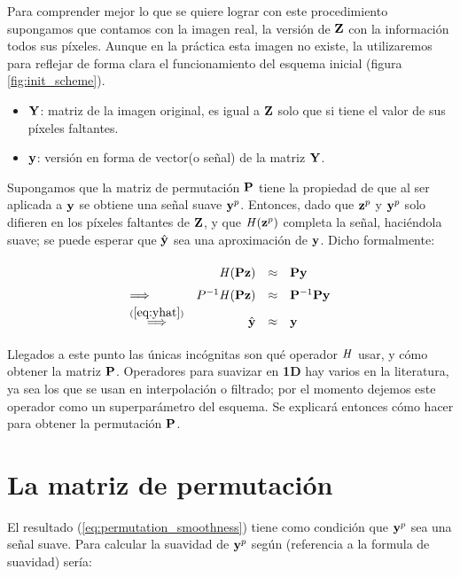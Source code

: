 Para comprender mejor lo que se quiere lograr con este procedimiento supongamos que contamos con la imagen real, la versi\'on de $\Z$ con la informaci\'on todos sus p\'ixeles. Aunque en la pr\'actica esta imagen no existe, la utilizaremos para reflejar de forma clara el funcionamiento del esquema inicial (figura \ref{fig:init_scheme}).

\begin{itemize}
	\item $\Y$: matriz de la imagen original, es igual a $\Z$ solo que si tiene el valor de sus p\'ixeles faltantes. 
	\item $\y$: versión en forma de vector(o señal) de la matriz $\Y$.
\end{itemize}

Supongamos que la matriz de permutaci\'on $\P$ tiene la propiedad de que al ser aplicada a $\y$ se obtiene una señal suave $\y^p$. Entonces, dado que $\z^p$ y $\y^p$ solo difieren en los p\'ixeles faltantes de $\Z$, y que $\H(\z^p)$ completa la señal, haciéndola suave; se puede esperar que $\yhat$ sea una aproximaci\'on de $\y$. Dicho formalmente:

\begin{equation}
	\def\arraystretch{1.5}
	\begin{array}{lrcl}
		                                           &     \H (\P\z ) &\approx& \P\y        \\ 
		\Longrightarrow                            & P^{-1}\H(\P\z) &\approx& \P^{-1}\P\y \\
		\overset{(\ref{eq:yhat})}{\Longrightarrow} &          \yhat &\approx& \y          \\
	\end{array}
	\label{eq:permutation_smoothness}
\end{equation}

Llegados a este punto las únicas incógnitas son qu\'e operador $\H$ usar, y c\'omo obtener la matriz $\P$. Operadores para suavizar en \textbf{1D} hay varios en la literatura, ya sea los que se usan en interpolaci\'on o filtrado; por el momento dejemos este operador como un superpar\'ametro del esquema. Se explicar\'a entonces c\'omo hacer para obtener la permutaci\'on $\P$.

\section{La matriz de permutaci\'on}

El resultado (\ref{eq:permutation_smoothness}) tiene como condici\'on que $\y^p$ sea una señal suave. Para calcular la suavidad de $\y^p$ según (referencia a la formula de suavidad) ser\'ia:

